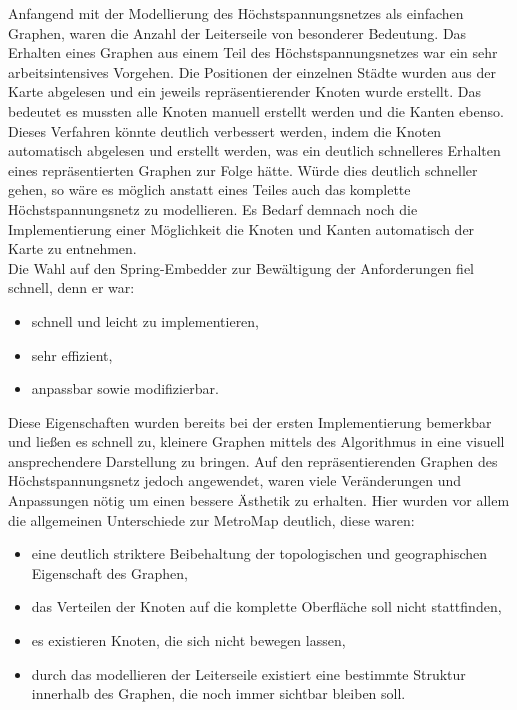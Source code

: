 Anfangend mit der Modellierung des Höchstspannungsnetzes als einfachen Graphen, waren die Anzahl der Leiterseile von besonderer Bedeutung. Das Erhalten eines Graphen aus einem Teil des Höchstspannungsnetzes war ein sehr arbeitsintensives Vorgehen. Die Positionen der einzelnen Städte wurden aus der Karte abgelesen und ein jeweils repräsentierender Knoten wurde erstellt. Das bedeutet es mussten alle Knoten manuell erstellt werden und die Kanten ebenso. Dieses Verfahren könnte deutlich verbessert werden, indem die Knoten automatisch abgelesen und erstellt werden, was ein deutlich schnelleres Erhalten eines repräsentierten Graphen zur Folge hätte. Würde dies deutlich schneller gehen, so wäre es möglich anstatt eines Teiles auch das komplette Höchstspannungsnetz zu modellieren. Es Bedarf demnach noch die Implementierung einer Möglichkeit die Knoten und Kanten automatisch der Karte zu entnehmen. \\

Die Wahl auf den Spring-Embedder zur Bewältigung der Anforderungen fiel schnell, denn er war:
\begin{itemize}
	\item schnell und leicht zu implementieren,
	\item sehr effizient,
	\item anpassbar sowie modifizierbar.
\end{itemize}
Diese Eigenschaften wurden bereits bei der ersten Implementierung bemerkbar und ließen es schnell zu, kleinere Graphen mittels des Algorithmus in eine visuell ansprechendere Darstellung zu bringen. Auf den repräsentierenden Graphen des Höchstspannungsnetz jedoch angewendet, waren viele Veränderungen und Anpassungen nötig um einen bessere Ästhetik zu erhalten. Hier wurden vor allem die allgemeinen Unterschiede zur MetroMap deutlich, diese waren:

\begin{itemize}
	\item eine deutlich striktere Beibehaltung der topologischen und geographischen Eigenschaft des Graphen,
	\item das Verteilen der Knoten auf die komplette Oberfläche soll nicht stattfinden,
	\item es existieren Knoten, die sich nicht bewegen lassen,
	\item durch das modellieren der Leiterseile existiert eine bestimmte Struktur innerhalb des Graphen, die noch immer sichtbar bleiben soll.
\end{itemize} 

